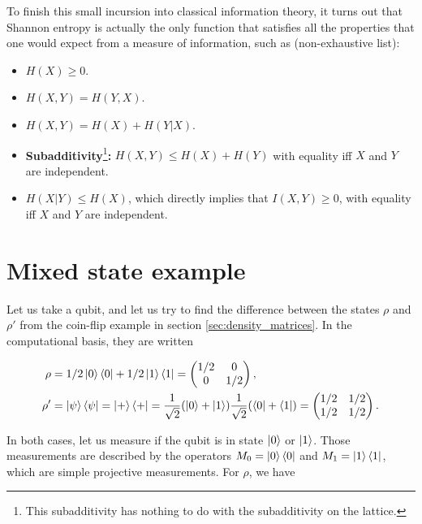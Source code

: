 To finish this small incursion into classical information theory, it turns out that Shannon entropy is actually the only function that satisfies all the properties that one would expect from a measure of information, such as (non-exhaustive list):

\begin{itemize}
    \item $H(X) \geq 0$.
    \item $H(X, Y) = H(Y, X)$.
    \item $H(X, Y) = H(X) + H(Y|X)$.
    \item \textbf{Subadditivity}\footnote{This subadditivity has nothing to do with the subadditivity on the lattice.}\textbf{:} $H(X, Y) \leq H(X) + H(Y)$ with equality iff $X$ and $Y$ are independent.
    \item $H(X|Y) \leq H(X)$, which directly implies that $I(X, Y) \geq 0$, with equality iff $X$ and $Y$ are independent.
\end{itemize}



\newpage

\section{Mixed state example}
\label{app:mixed_example}

\setcounter{equation}{0}

Let us take a qubit, and let us try to find the difference between the states $\rho$ and $\rho'$ from the coin-flip example in section \ref{sec:density_matrices}. In the computational basis, they are written

\begin{align}
    \rho &= 1/2 \ket{0}\bra{0} + 1/2 \ket{1}\bra{1} = \left(\begin{matrix}
        1/2 & 0\\
        0 & 1/2
    \end{matrix}\right),\\
    \rho' &= \ket{\psi}\bra{\psi} = \ket{+}\bra{+} = \frac{1}{\sqrt{2}}(\ket{0} + \ket{1})\frac{1}{\sqrt{2}}(\bra{0} + \bra{1}) = \left(\begin{matrix}
        1/2 & 1/2\\
        1/2 & 1/2
    \end{matrix}\right).
\end{align}

In both cases, let us measure if the qubit is in state $\ket{0}$ or $\ket{1}$. Those measurements are described by the operators $M_0 = \ket{0}\bra{0}$ and $M_1 = \ket{1}\bra{1}$, which are simple projective measurements. For $\rho$, we have

